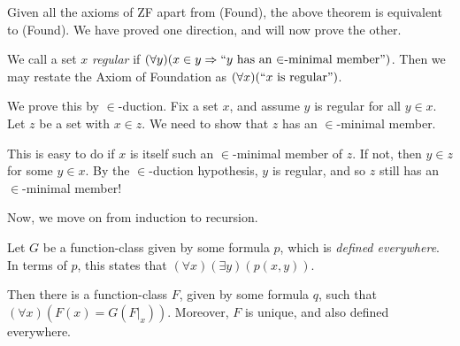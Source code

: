 \documentclass{article}
\begin{document}
Given all the axioms of ZF apart from (Found), the above theorem is equivalent to (Found). We have proved one direction, and will now prove the other.

\begin{theorem}
	We call a set $x$ \textit{regular} if $(\forall y)(x \in y \Rightarrow ``y \text{ has an $\in$-minimal member}")$.
    Then we may restate the Axiom of Foundation as $(\forall x)(``x \text{ is regular}")$.
\end{theorem}

\begin{prf}
    We prove this by $\in$-duction. Fix a set $x$, and assume $y$ is regular for all $y \in x$. Let $z$ be a set with $x \in z$. We need to show that $z$ has an $\in$-minimal member.
    
    This is easy to do if $x$ is itself such an $\in$-minimal member of $z$. If not, then $y \in z$ for some $y \in x$. By the $\in$-duction hypothesis, $y$ is regular, and so $z$ still has an $\in$-minimal member!
\end{prf}

Now, we move on from induction to recursion.

\begin{theorem}
    Let $G$ be a function-class given by some formula $p$, which is \textit{defined everywhere}. In terms of $p$, this states that $(\forall x)(\exists y)(p(x, y))$.
    
    Then there is a function-class $F$, given by some formula $q$, such that $(\forall x)(F(x) = G(F|_x))$. Moreover, $F$ is unique, and also defined everywhere.
\end{theorem}
\end{document}
